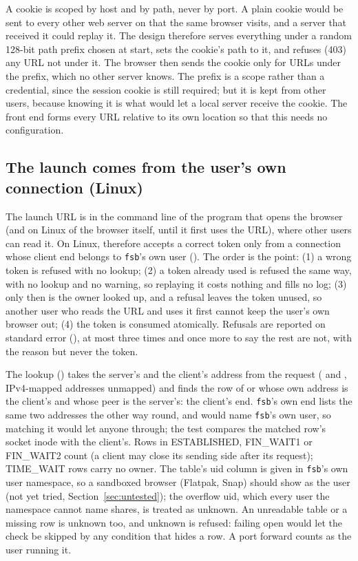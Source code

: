 A cookie is scoped by host and by path, never by port.  A plain  cookie would be
sent to every other web server on  that the same browser visits, and a server
that received it could replay it.  The design therefore serves everything under a random
128-bit path prefix chosen at start, sets the cookie's path to it, and refuses (403) any URL not
under it.  The browser then sends the cookie only for URLs under the prefix, which no other
server knows.  The prefix is a scope rather than a credential, since the session cookie is
still required; but it is kept from other users, because knowing it is what would let a
local server receive the cookie.  The
front end forms every URL relative to its own location so that this needs no configuration.

\subsection{The launch comes from the user's own connection (Linux)}
\label{sec:launchowner}

The launch URL is in the command line of the program that opens the browser (and on
Linux of the browser itself, until it first uses the URL), where other users can
read it.  On Linux,  therefore accepts a correct token only from a
connection whose client end belongs to \texttt{fsb}'s own user ().  The
order is the point: (1) a wrong token is refused with no lookup; (2) a token already
used is refused the same way, with no lookup and no warning, so replaying it costs
nothing and fills no log; (3) only then is the owner looked up, and a refusal leaves
the token unused, so another user who reads the URL and uses it first cannot keep
the user's own browser out; (4) the token is consumed atomically.  Refusals are
reported on standard error (), at most three times and once more
to say the rest are not, with the reason but never the token.

The lookup () takes the server's and the client's address
from the request ( and , IPv4-mapped
addresses unmapped) and finds the row of  or  whose
own address is the client's and whose peer is the server's: the client's end.
\texttt{fsb}'s own end lists the same two addresses the other way round, and would
name \texttt{fsb}'s own user, so matching it would let anyone through; the test
compares the matched row's socket inode with the client's.  Rows in ESTABLISHED,
FIN\_WAIT1 or FIN\_WAIT2 count (a client may close its sending side after its
request); TIME\_WAIT rows carry no owner.  The table's uid column is given in
\texttt{fsb}'s own user namespace, so a sandboxed browser (Flatpak, Snap) should show
as the user (not yet tried, Section~\ref{sec:untested}); the overflow uid, which every user the namespace cannot name shares, is
treated as unknown.  An unreadable table or a missing row is unknown too, and
unknown is refused: failing open would let the check be skipped by any condition
that hides a row.  A port forward counts as the user running it.

